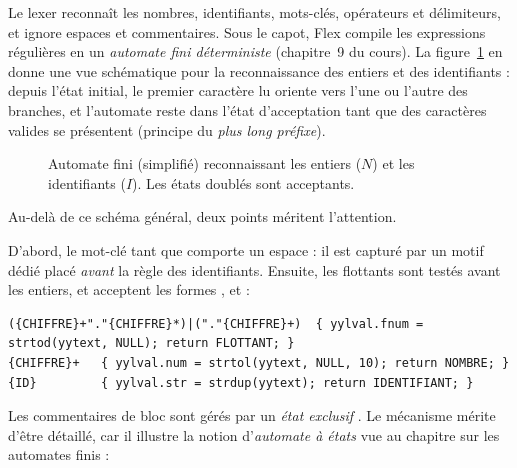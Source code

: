 Le lexer reconnaît les nombres, identifiants, mots-clés, opérateurs et
délimiteurs, et ignore espaces et commentaires. Sous le capot, Flex compile les
expressions régulières en un \emph{automate fini déterministe} (chapitre~9 du
cours). La figure~\ref{fig:dfa} en donne une vue schématique pour la
reconnaissance des entiers et des identifiants : depuis l'état initial, le premier
caractère lu oriente vers l'une ou l'autre des branches, et l'automate reste dans
l'état d'acceptation tant que des caractères valides se présentent (principe du
\emph{plus long préfixe}).

\begin{figure}[ht]
\centering
{}
\caption{Automate fini (simplifié) reconnaissant les entiers ($N$) et les
identifiants ($I$). Les états doublés sont acceptants.}
\label{fig:dfa}
\end{figure}

Au-delà de ce schéma général, deux points méritent l'attention.

D'abord, le mot-clé \og tant que \fg{} comporte un espace : il est capturé par un
motif dédié placé \emph{avant} la règle des identifiants. Ensuite, les flottants
sont testés avant les entiers, et acceptent les formes ,  et
 :

\begin{lstlisting}[style=gram,caption={Extrait de \code{ilang.l} : littéraux numériques.}]
({CHIFFRE}+"."{CHIFFRE}*)|("."{CHIFFRE}+)  { yylval.fnum = strtod(yytext, NULL); return FLOTTANT; }
{CHIFFRE}+   { yylval.num = strtol(yytext, NULL, 10); return NOMBRE; }
{ID}         { yylval.str = strdup(yytext); return IDENTIFIANT; }
\end{lstlisting}

Les commentaires de bloc sont gérés par un \emph{état exclusif} .
Le mécanisme mérite d'être détaillé, car il illustre la notion d'\emph{automate à
états} vue au chapitre sur les automates finis :

